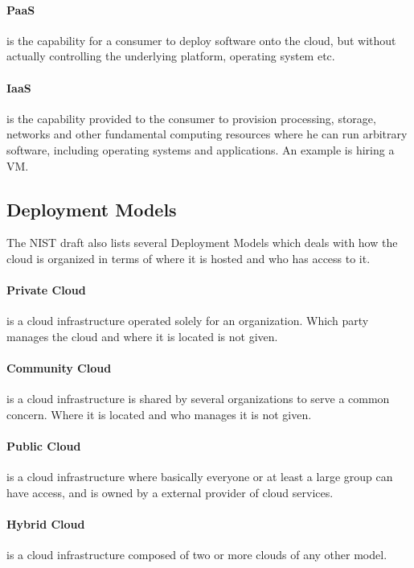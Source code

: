 \documentclass[pdftex,english,10pt,b5paper,twoside]{book}
\begin{document}
\paragraph{\ac{PaaS}} is the capability for a consumer to deploy software onto
the cloud, but without actually controlling the underlying platform, operating
system etc.

\paragraph{\ac{IaaS}} is the capability provided to the consumer to provision
processing, storage, networks and other fundamental computing resources where
he can run arbitrary software, including operating systems and applications. An
example is hiring a \ac{VM}.

\subsection{Deployment Models}
The \ac{NIST} draft also lists several Deployment Models which deals with how
the cloud is organized in terms of where it is hosted and who has access to it.

\paragraph{Private Cloud} is a cloud infrastructure operated solely for an
organization. Which party manages the cloud and where it is located is not
given.

\paragraph{Community Cloud} is a cloud infrastructure is shared by several
organizations to serve a common concern. Where it is located and who manages it
is not given.

\paragraph{Public Cloud} is a cloud infrastructure where basically everyone or
at least a large group can have access, and is owned by a external provider of
cloud services.

\paragraph{Hybrid Cloud} is a cloud infrastructure composed of two or more
clouds of any other model.
\end{document}
